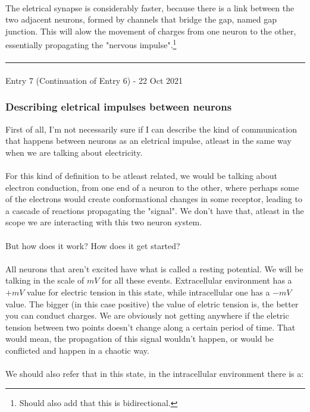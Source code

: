 \documentclass[12pt,  letterpaper]{article}
\begin{document}
\paragraph*{}
The eletrical synapse is considerably faster, because there is a link between the two adjacent neurons, formed by channels that bridge the gap, named gap junction. This will alow the movement of charges from one neuron to the other, essentially propagating the "nervous impulse".\footnote{Should also add that this is bidirectional.}
\paragraph*{}
\hrule
\paragraph*{}
Entry 7 (Continuation of Entry 6) - 22 Oct 2021
\subsubsection*{Describing eletrical impulses between neurons}
First of all, I'm not necessarily sure if I can describe the kind of communication that happens between neurons as an eletrical impulse, atleast in the same way when we are talking about electricity.\paragraph*{}
For this kind of definition to be atleast related, we would be talking about electron conduction, from one end of a neuron to the other, where perhaps some of the electrons would create conformational changes in some receptor, leading to a cascade of reactions propagating the "signal".
We don't have that, atleast in the scope we are interacting with this two neuron system.\paragraph*{}
But how does it work? How does it get started?
\paragraph*{}
All neurons that aren't excited have what is called a resting potential. We will be talking in the scale of $mV$ for all these events. Extracellular environment has a $+mV$ value for electric tension in this state, while intracellular one has a $-mV$ value. The bigger (in this case positive) the value of eletric tension is, the better you can conduct charges. We are obviously not getting anywhere if the eletric tension between two points doesn't change along a certain period of time. That would mean, the propagation of this signal wouldn't happen, or would be conflicted and happen in a chaotic way.\paragraph*{}
We should also refer that in this state, in the intracellular environment there is a:
\end{document}
